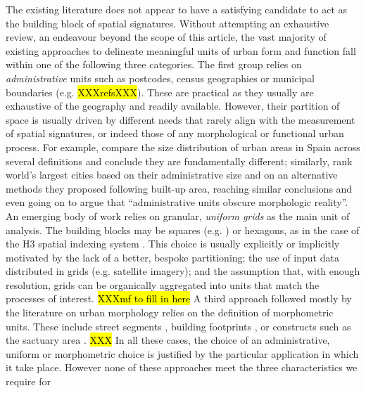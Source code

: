 The existing literature does not appear to have a satisfying candidate to act
as the building block of spatial signatures.
%
Without attempting an exhaustive review, an endeavour beyond the scope of this
article, the vast majority of existing approaches to delineate meaningful
units of urban form and function fall within one of the following three
categories.
The first group relies on \textit{administrative} units such as postcodes, census geographies
or municipal boundaries (e.g. \hl{XXXrefsXXX}).
%
These are practical as they usually are exhaustive of the geography and
readily available. However, their partition of space is usually driven by
different needs that rarely align with the measurement of spatial signatures,
or indeed those of any morphological or functional urban process. For example,
\cite{puente2020sensitive} compare the size distribution of urban areas in
Spain across several definitions and conclude they are fundamentally
different; similarly, \cite{taubenbock2019new} rank world's largest cities
based on their administrative size and on an alternative methods they proposed
following built-up area, reaching similar conclusions and even going on to
argue that ``administrative units obscure morphologic reality''.
An emerging body of work relies on granular, \textit{uniform grids} as the main unit of
analysis. The building blocks may be squares (e.g. \citealp{jochem2020}) or
hexagons, as in the case of the H3 spatial indexing system
\citep{brodsky2018h3}. This choice is usually explicitly or implicitly
motivated by the lack of a better, bespoke partitioning; the use of input data distributed
in grids (e.g. satellite imagery); and the assumption that, with enough
resolution, grids can be organically aggregated into units that match the
processes of interest.
\hl{XXXmf to fill in here}
A third approach followed mostly by the literature on urban morphology relies
on the definition of morphometric units. These include street segments
\citep{araldi2019}, building footprints \citep{fleischmann2020morphological}, or constructs such as the
sactuary area \citep{mehaffy2010urban,dibble2019origin}.
\hl{XXX}
In all these cases, the choice of an administrative, uniform or morphometric
choice is justified by the particular application in which it take place.
However none of these approaches meet the three characteristics we require for
